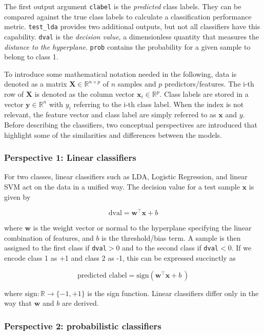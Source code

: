 \documentclass[utf8]{frontiersSCNS} %
\newcommand{\w}{\mathbf{w}}
\newcommand{\x}{\mathbf{x}}
\newcommand{\R}{\mathbb{R}}
\newcommand{\X}{\mathbf{X}}
\newcommand{\ttt}[1]{\texttt{#1}}
\begin{document}
The first output argument \ttt{clabel} is the \textit{predicted} class labels. They can be compared against the true class labels to calculate a classification performance metric. \ttt{test\_lda} provides two additional outputs, but not all classifiers have this capability. \ttt{dval} is the \textit{decision value}, a dimensionless quantity that measures the \textit{distance to the hyperplane}. \ttt{prob} contains the probability for a given sample to belong to class 1.

To introduce some mathematical notation needed in the following, data is denoted as a matrix $\X\in\R^{n \times p}$ of $n$ samples and $p$ predictors/features. The i-th row of $\X$ is denoted as the column vector $\x_i\in\R^p$. Class labels are stored in a vector $\mathbf{y}\in\R^n$ with $y_i$ referring to the i-th class label. When the index is not relevant, the feature vector and class label are simply referred to as $\x$ and $y$. Before describing the classifiers, two conceptual perspectives are introduced that highlight some of the similarities and differences between the models.

\subsubsection{Perspective 1: Linear classifiers}

For two classes, linear classifiers such as LDA, Logistic Regression, and linear SVM act on the data in a unified way. The decision value for a test sample $\x$ is given by

\begin{equation}
\label{eq:linear_dval}
\text{dval} = \w^\top\x + b
\end{equation}

where $\w$ is the weight vector or normal to the hyperplane specifying the linear combination of features, and $b$ is the threshold/bias term.  A sample is then  assigned to the first class if \ttt{dval}$>0$ and to the second class if \ttt{dval}$<0$. If we encode class 1 as +1 and class 2 as -1, this can be expressed succinctly as

\begin{equation*}
\text{predicted clabel} =\text{sign} \left(\w^\top\x + b\,\right)
\end{equation*}

where $\text{sign}:\R\rightarrow\{-1,+1\}$ is the sign function. Linear classifiers differ only in the way that $\w$ and $b$ are derived.

\subsubsection{Perspective 2:  probabilistic classifiers}
\end{document}
